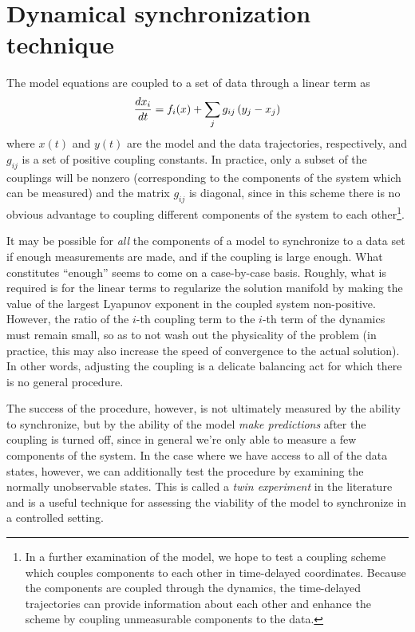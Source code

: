 \documentclass{article} %
\begin{document}
\section{Dynamical synchronization technique}
The model equations are coupled to a set of data through a linear term as
\begin{align}
	\frac{d x_i}{d t} = f_i(x) + \sum_{j} g_{ij} \left(y_j - x_j\right)
\end{align}
where $x(t)$ and $y(t)$ are the model and the data trajectories, respectively, and $g_{ij}$ is a set of positive coupling constants.  In practice, only a subset of the couplings will be nonzero (corresponding to the components of the system which can be measured) and the matrix $g_{ij}$ is diagonal, since in this scheme there is no obvious advantage to coupling different components of the system to each other\footnote{In a further examination of the model, we hope to test a coupling scheme which couples components to each other in time-delayed coordinates.  Because the components are coupled through the dynamics, the time-delayed trajectories can provide information about each other and enhance the scheme by coupling unmeasurable components to the data.}.

It may be possible for \emph{all} the components of a model to synchronize to a data set if enough measurements are made, and if the coupling is large enough.  What constitutes ``enough'' seems to come on a case-by-case basis.  Roughly, what is required is for the linear terms to regularize the solution manifold by making the value of the largest Lyapunov exponent in the coupled system non-positive.  However, the ratio of the $i$-th coupling term to the $i$-th term of the dynamics must remain small, so as to not wash out the physicality of the problem (in practice, this may also increase the speed of convergence to the actual solution).  In other words, adjusting the coupling is a delicate balancing act for which there is no general procedure.

The success of the procedure, however, is not ultimately measured by the ability to synchronize, but by the ability of the model \emph{make predictions} after the coupling is turned off, since in general we're only able to measure a few components of the system.  In the case where we have access to all of the data states, however, we can additionally test the procedure by examining the normally unobservable states.  This is called a \emph{twin experiment} in the literature and is a useful technique for assessing the viability of the model to synchronize in a controlled setting.
\end{document}
